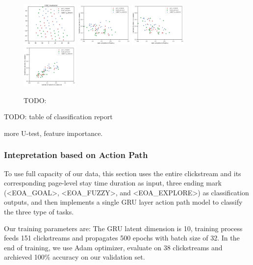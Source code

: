\begin{figure}[H]
    \centering
    \includegraphics[width=0.25\textwidth]{figures/tsne-amazon}
    \includegraphics[width=0.25\textwidth]{figures/2d-eff-dur-amazon}
    \includegraphics[width=0.25\textwidth]{figures/2d-eff-len-amazon}
    \includegraphics[width=0.25\textwidth]{figures/2d-len-dur-amazon}
    \caption{TODO:}
    \label{fig:general-amazon}
\end{figure}

TODO: table of classification report

more U-test, feature importance.

\subsubsection{Intepretation based on Action Path}
\label{sec:inter-action-path}

To use full capacity of our data, this section uses the entire clickstream and its corresponding
page-level stay time duration as input, three ending mark (<EOA\_GOAL>, <EOA\_FUZZY>, and <EOA\_EXPLORE>) 
as classification outputs, and then implements a single GRU layer action path model 
to classify the three type of tasks.

Our training parameters are: 
The GRU latent dimension is 10, training process feeds 151 clickstreams and 
propagates 500 epochs with batch size of 32.
In the end of training, we use Adam optimizer, evaluate on 38 clickstreams and 
archieved 100\% accuracy on our validation set.

